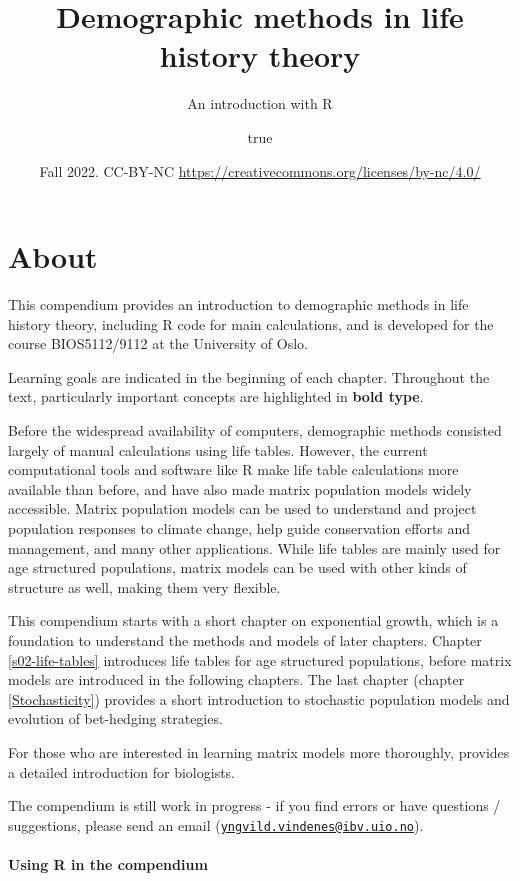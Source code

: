\documentclass[
]{book}
\title{Demographic methods in life history theory}
\subtitle{An introduction with R}
\author{true}
\date{Fall 2022. CC-BY-NC \url{https://creativecommons.org/licenses/by-nc/4.0/}}
\begin{document}
\maketitle

{
\setcounter{tocdepth}{1}
\tableofcontents
}
\hypertarget{about}{%
\chapter*{About}\label{about}}

This compendium provides an introduction to demographic methods in life history theory, including R code for main calculations, and is developed for the course BIOS5112/9112 at the University of Oslo.

Learning goals are indicated in the beginning of each chapter. Throughout the text, particularly important concepts are highlighted in \textbf{bold type}.

Before the widespread availability of computers, demographic methods consisted largely of manual calculations using life tables. However, the current computational tools and software like R \citep{R} make life table calculations more available than before, and have also made matrix population models widely accessible. Matrix population models can be used to understand and project population responses to climate change, help guide conservation efforts and management, and many other applications. While life tables are mainly used for age structured populations, matrix models can be used with other kinds of structure as well, making them very flexible.

This compendium starts with a short chapter on exponential growth, which is a foundation to understand the methods and models of later chapters. Chapter \ref{s02-life-tables} introduces life tables for age structured populations, before matrix models are introduced in the following chapters. The last chapter (chapter \ref{Stochasticity}) provides a short introduction to stochastic population models and evolution of bet-hedging strategies.

For those who are interested in learning matrix models more thoroughly, \citet{Caswell1} provides a detailed introduction for biologists.

The compendium is still work in progress - if you find errors or have questions / suggestions, please send an email (\href{mailto:yngvild.vindenes@ibv.uio.no}{\nolinkurl{yngvild.vindenes@ibv.uio.no}}).

\hypertarget{using-r-in-the-compendium}{%
\subsubsection*{Using R in the compendium}\label{using-r-in-the-compendium}}
\end{document}
